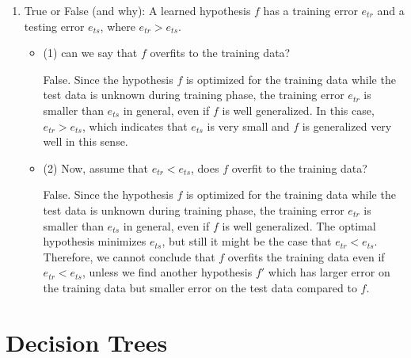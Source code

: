 \begin{enumerate}
\item True or False (and why): A learned hypothesis $f$ has a training error $e_{tr}$ and a testing error $e_{ts}$, where $e_{tr} > e_{ts}$.

\begin{itemize}
\item (1) can we say that $f$ overfits to the training data?

False. Since the hypothesis $f$ is optimized for the training data while the test data is unknown during training phase, the training error $e_{tr}$ is smaller than $e_{ts}$ in general, even if $f$ is well generalized. In this case, $e_{tr} > e_{ts}$, which indicates that $e_{ts}$ is very small and $f$ is generalized very well in this sense.

\item (2) Now, assume that $e_{tr} < e_{ts}$, does $f$ overfit to the training data?

False. Since the hypothesis $f$ is optimized for the training data while the test data is unknown during training phase, the training error $e_{tr}$ is smaller than $e_{ts}$ in general, even if $f$ is well generalized. The optimal hypothesis minimizes $e_{ts}$, but still it might be the case that $e_{tr} < e_{ts}$. Therefore, we cannot conclude that $f$ overfits the training data even if $e_{tr} < e_{ts}$, unless we find another hypothesis $f'$ which has larger error on the training data but smaller error on the test data compared to $f$.

\end{itemize}

\end{enumerate}

\section{Decision Trees}

